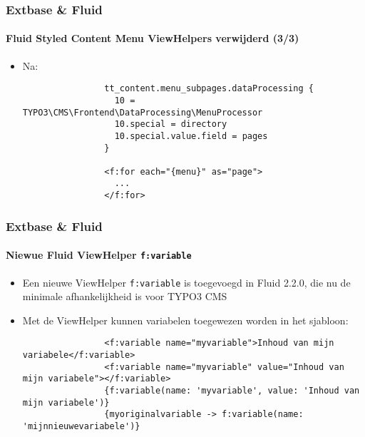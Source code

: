 \begin{frame}[fragile]
	\frametitle{Extbase \& Fluid}
	\framesubtitle{Fluid Styled Content Menu ViewHelpers verwijderd (3/3)}

	\lstset{basicstyle=\tiny\ttfamily}

	\begin{itemize}

		\item Na:

			\begin{lstlisting}
				tt_content.menu_subpages.dataProcessing {
				  10 = TYPO3\CMS\Frontend\DataProcessing\MenuProcessor
				  10.special = directory
				  10.special.value.field = pages
				}

				<f:for each="{menu}" as="page">
				  ...
				</f:for>
			\end{lstlisting}

	\end{itemize}

\end{frame}


\begin{frame}[fragile]
	\frametitle{Extbase \& Fluid}
	\framesubtitle{Niewue Fluid ViewHelper \texttt{f:variable}}

	\begin{itemize}

		\item Een nieuwe ViewHelper \texttt{f:variable} is toegevoegd in Fluid 2.2.0,
			die nu de minimale afhankelijkheid is voor TYPO3 CMS

		\item Met de ViewHelper kunnen variabelen toegewezen worden in het sjabloon:

			\begin{lstlisting}
				<f:variable name="myvariable">Inhoud van mijn variabele</f:variable>
				<f:variable name="myvariable" value="Inhoud van mijn variabele"></f:variable>
				{f:variable(name: 'myvariable', value: 'Inhoud van mijn variabele')}
				{myoriginalvariable -> f:variable(name: 'mijnnieuwevariabele')}
			\end{lstlisting}

	\end{itemize}

\end{frame}

